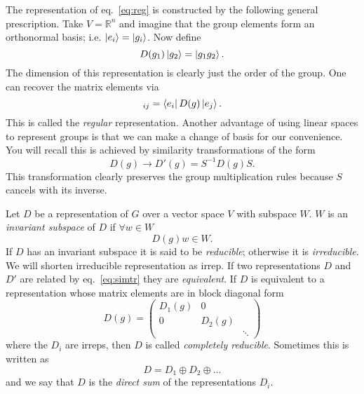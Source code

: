 The representation of eq.~\eqref{eq:reg} is constructed by 
the following general prescription. Take $V=\mathbb{R}^n$ 
and imagine that the group elements form an orthonormal 
basis; i.e. $\ket{e_i}=\ket{g_i}$. Now define
\begin{equation}
  D(g_1)\ket{g_2}=\ket{g_1g_2}.
\end{equation}
The dimension of this representation is clearly just the order
of the group. One can recover the matrix elements via
\begin{equation}
  [D(g)]_{ij}=\bra{e_i}D(g)\ket{e_j}.
\end{equation}
  This is called the {\it regular} 
representation. Another advantage of using linear spaces to represent groups
is that we can make a change of basis for our convenience. You
will recall this is achieved by similarity transformations
of the form
\begin{equation}\label{eq:simtr}
  D(g)\to D'(g)=S^{-1}D(g)S.
\end{equation}
This transformation clearly preserves the group multiplication
rules because $S$ cancels with its inverse.

Let $D$ be a representation of $G$ over a vector space $V$ with
subspace $W$. $W$ is an {\it invariant subspace} 
of $D$ if
$\forall w\in W$
\begin{equation}
  D(g)w\in W.
\end{equation}
If $D$ has an invariant subspace it is said to be {\it reducible};
 otherwise it is {\it irreducible}. 
We will shorten irreducible representation as irrep. If two representations $D$
and $D'$ are related by eq.~\eqref{eq:simtr} they are {\it equivalent}.
If $D$ is equivalent to a representation whose matrix
elements are in block diagonal form
\begin{equation}
  D(g)=\left(\begin{array}{ccc}
             D_1(g) & 0      &       \\
             0      & D_2(g) &       \\
                    &        & \ddots
             \end{array}\right)
\end{equation}
where the $D_i$ are irreps, then $D$ is called {\it completely
reducible}. Sometimes this is written as
\begin{equation}
  D=D_1\oplus D_2\oplus ...
\end{equation}
and we say that $D$ is the {\it direct sum} 
of the representations $D_i$.


